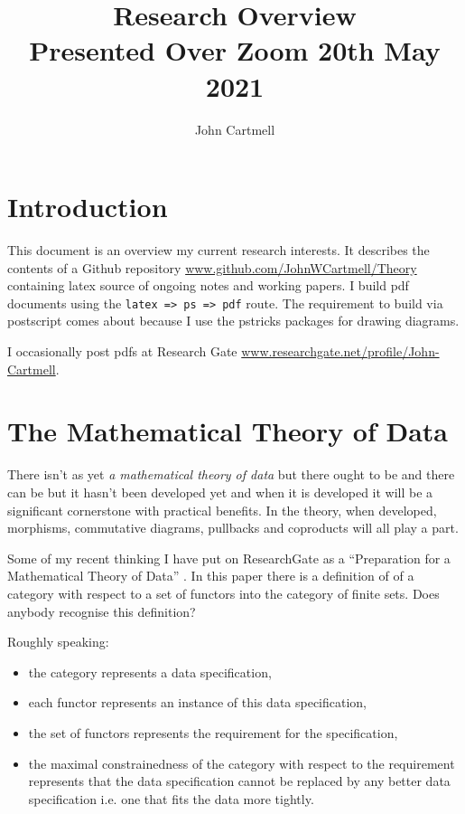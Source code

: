 \documentclass[10pt,a4paper]{article}
\theoremstyle{remark}
\begin{document}
\title{Research Overview \\
\small Presented Over Zoom 20th May 2021}

\date{}
\author{John Cartmell}

\maketitle


\section{Introduction}

\note This document is an overview my current research interests. It describes the contents of  a Github repository \url{www.github.com/JohnWCartmell/Theory} containing latex source of ongoing notes and working papers. I  build pdf documents using the \verb!latex => ps => pdf! route. The requirement to build via postscript comes about because I use the pstricks packages for drawing diagrams.

\note I occasionally post pdfs at Research Gate \url{www.researchgate.net/profile/John-Cartmell}.

\section{The Mathematical Theory of Data}
\note 
There isn't as yet \textit{a mathematical theory of data} but there ought to be and there can be but it hasn't been developed yet and when it is developed it will be a significant cornerstone with  practical benefits. 
In the theory, when developed, morphisms, commutative diagrams, pullbacks and coproducts will all play a part.

Some of my recent thinking I have put on ResearchGate as a ``Preparation for a Mathematical Theory of Data''
\cite{CartmellPreparation}. In this paper there is a definition of  of a category with respect to a set of functors into the category of finite sets. Does anybody recognise this definition? 

Roughly speaking:
\begin{itemize}
\item the category represents a data specification,
\item each functor represents an instance of this data specification,
\item the set of functors represents the requirement for the specification,
\item the maximal constrainedness of the category with respect to the requirement represents that the data specification cannot be replaced by any better data specification i.e. one that fits the data more tightly.
\end{itemize}
\end{document}
